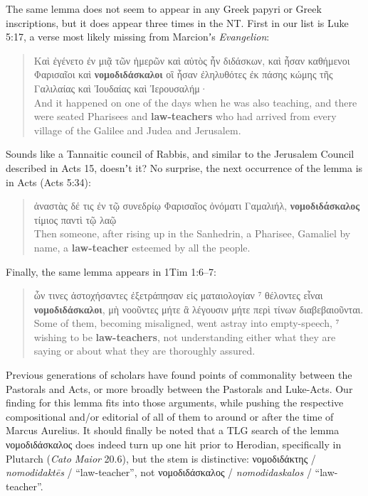  \noindent{}The same lemma does not seem to appear in any Greek papyri or Greek inscriptions, %
 but it does appear three times in the NT. First in our list is Luke 5:17, %
a verse most likely missing from Marcionʼs \textit{Evangelion}:

\vspace*{3mm} 
 \begin{quote}Καὶ ἐγένετο ἐν μιᾷ τῶν ἡμερῶν καὶ αὐτὸς ἦν διδάσκων, %
   καὶ ἦσαν καθήμενοι Φαρισαῖοι καὶ \textbf{νομοδιδάσκαλοι} %
   οἳ ἦσαν ἐληλυθότες ἐκ πάσης κώμης τῆς Γαλιλαίας %
   καὶ Ἰουδαίας καὶ Ἰερουσαλήμ· \\[1mm] %
   And it happened on one of the days when he was also teaching, %
   and there were seated Pharisees and \textbf{law-teachers} %
   who had arrived from every village of the Galilee %
   and Judea and Jerusalem. %
   \end{quote} %
   \vspace*{3mm}
  
\noindent{}Sounds like a Tannaitic council of Rabbis, %
and similar to the Jerusalem Council described in Acts 15, doesnʼt it? %
No surprise, the next occurrence of the lemma is in Acts (Acts 5:34): %

\vspace*{3mm}
 \begin{quote}ἀναστὰς δέ τις ἐν τῷ συνεδρίῳ Φαρισαῖος
 ὀνόματι Γαμαλιήλ, \textbf{νομοδιδάσκαλος} τίμιος παντὶ τῷ
 λαῷ \\[1mm] %
 Then someone, after rising up in the Sanhedrin, %
 a Pharisee, Gamaliel by name, a \textbf{law-teacher} esteemed by all the people. \end{quote} %
 \vspace*{3mm}

\noindent{}Finally, the same lemma appears in 1Tim 1:6--7:

\vspace*{3mm} 
 \begin{quote} ὧν τινες ἀστοχήσαντες ἐξετράπησαν εἰς ματαιολογίαν %
  ⁷ θέλοντες εἶναι \textbf{νομοδιδάσκαλοι}, %
  μὴ νοοῦντες μήτε ἃ λέγουσιν μήτε περὶ τίνων διαβεβαιοῦνται. \\[1mm] %
  Some of them, becoming misaligned, went astray into empty-speech, %
  ⁷ wishing to be \textbf{law-teachers}, %
  not understanding either what they are saying or about what they are thoroughly assured. \end{quote} %
 \clearpage

 Previous generations of scholars have found points of commonality between %
 the Pastorals and Acts, or more broadly between the Pastorals and Luke-Acts. %
 Our finding for this lemma fits into those arguments, %
 while pushing the respective compositional and/or editorial of all of them to around %
 or after the time of Marcus Aurelius. %
 It should finally be noted that a TLG search of the lemma νομοδιδάσκαλος %
 does indeed turn up one hit prior to Herodian, %
 specifically in Plutarch (\textit{Cato Maior} 20.6), but the stem is distinctive: %
νομοδιδάκτης / \textit{nomodidaktēs} / “law-teacher”, %
not νομοδιδάσκαλος / \textit{nomodidaskalos} / “law-teacher”. \\[1mm] %

